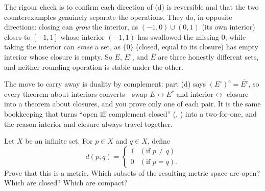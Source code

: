 \documentclass[main.tex]{subfiles}
\begin{document}
\begin{Reflection}
The rigour check is to confirm each direction of (d) is reversible and that the two counterexamples
genuinely separate the operations. They do, in opposite directions: closing can \emph{grow} the
interior, as $(-1,0)\cup(0,1)$ (its own interior) closes to $[-1,1]$ whose interior $(-1,1)$ has
swallowed the missing $0$; while taking the interior can \emph{erase} a set, as $\{0\}$ (closed, equal
to its closure) has empty interior whose closure is empty. So $E$, $E^{\circ}$, and $\overline{E}$ are
three honestly different sets, and neither rounding operation is stable under the other.

The move to carry away is duality by complement: part (d) says $(E^{\circ})^{c}=\overline{E^{c}}$, so
every theorem about interiors converts---swap $E\leftrightarrow E^{c}$ and interior$\leftrightarrow$
closure---into a theorem about closures, and you prove only one of each pair. It is the same
bookkeeping that turns ``open iff complement closed'' (, ) into a two-for-one, and the reason interior and closure always travel together.
\end{Reflection}

Let $X$ be an infinite set. For $p\in X$ and $q\in X$, define
\[
d(p,q)=
\begin{cases}
1 & (\text{if } p\neq q)\\
0 & (\text{if } p=q).
\end{cases}
\]
Prove that this is a metric. Which subsets of the resulting metric space are open? Which are closed?
Which are compact?
\end{document}
